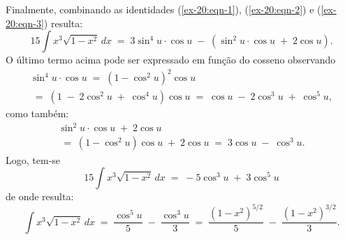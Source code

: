 \documentclass[12pt]{article}
\begin{document}
Finalmente, combinando as identidades (\ref{ex-20:eqn-1}),
(\ref{ex-20:eqn-2}) e (\ref{ex-20:eqn-3}) resulta:
\begin{equation*}
15\int x^{3}\sqrt{1-x^{2}}\,dx
\;=\; 3\sin^{4}u\cdot\cos u
\;-\; \left(\sin^{2}u\cdot\cos u \;+\; 2\cos u\right).
\end{equation*}
O último termo acima pode ser expressado em função do cosseno
observando
\begin{multline*}
\sin^{4}u\cdot\cos u
\;=\; (1-\cos^{2}u)^{2}\cos u \\
\;=\; (1 \;-\; 2\cos^{2}u \;+\; \cos^{4}u)\cos u
\;=\; \cos u \;-\; 2\cos^{3}u \;+\; \cos^{5}u,
\end{multline*}
como também:
\begin{multline*}
\sin^{2}u\cdot\cos u \;+\; 2\cos u \\
\;=\; (1-\cos^{2}u)\cos u \;+\; 2\cos u
\;=\; 3\cos u \;-\; \cos^{3}u.
\end{multline*}
Logo, tem-se
\begin{equation*}
15\int x^{3}\sqrt{1-x^{2}}\,dx
\;=\; -5\cos^{3}u \;+\; 3\cos^{5}u
\end{equation*}
de onde resulta:
\begin{equation*}
\int x^{3}\sqrt{1-x^{2}}\,dx
\;=\; \frac{\cos^{5}u}{5} \;-\; \frac{\cos^{3}u}{3}
\;=\; \frac{(1-x^{2})^{5/2}}{5} \;-\; \frac{(1-x^{2})^{3/2}}{3}.
\end{equation*}

\end{document}
